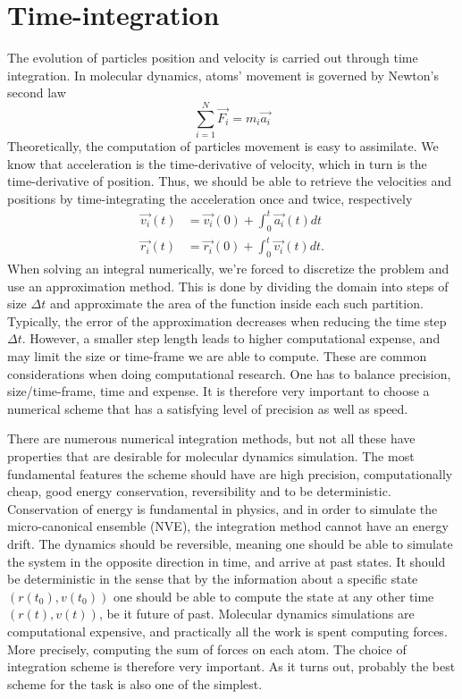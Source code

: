 \documentclass[twoside,english]{uiofysmaster}
\begin{document}
\section{Time-integration}
The evolution of particles position and velocity is carried out through time integration.
In molecular dynamics, atoms' movement is governed by Newton's second law
\begin{equation}
	\sum_{i=1}^{N}\vec{F_i} = m_i\vec{a_i}
\end{equation}
Theoretically, the computation of particles movement is easy to assimilate.
We know that acceleration is the time-derivative of velocity, which in turn is the time-derivative of position.
Thus, we should be able to retrieve the velocities and positions by time-integrating the acceleration once and twice, respectively
\begin{align}
	\vec{v_i}(t) &= \vec{v_i}(0) + \int_{0}^{t}\vec{a_i}(t) dt \\
	\vec{r_i}(t) &= \vec{r_i}(0) + \int_{0}^{t}\vec{v_i}(t) dt.
\end{align}
When solving an integral numerically, we're forced to discretize the problem and use an approximation method.
This is done by dividing the domain into steps of size $\Delta t$ and approximate the area of the function inside each such partition.
Typically, the error of the approximation decreases when reducing the time step $\Delta t$. 
However, a smaller step length leads to higher computational expense, and may limit the size or time-frame we are able to compute. 
These are common considerations when doing computational research. 
One has to balance precision, size/time-frame, time and expense. 
It is therefore very important to choose a numerical scheme that has a satisfying level of precision as well as speed. 

There are numerous numerical integration methods, but not all these have properties that are desirable for molecular dynamics simulation. 
The most fundamental features the scheme should have are high precision, computationally cheap, good energy conservation, reversibility and to be deterministic.
Conservation of energy is fundamental in physics, and in order to simulate the micro-canonical ensemble (NVE), the integration method cannot have an energy drift.
The dynamics should be reversible, meaning one should be able to simulate the system in the opposite direction in time, and arrive at past states.
It should be deterministic in the sense that by the information about a specific state $(r(t_0), v(t_0))$ one should be able to compute the state at any other time $(r(t), v(t))$, be it future of past.
Molecular dynamics simulations are computational expensive, and practically all the work is spent computing forces. 
More precisely, computing the sum of forces on each atom. 
The choice of integration scheme is therefore very important. 
As it turns out, probably the best scheme for the task is also one of the simplest. 
\end{document}
